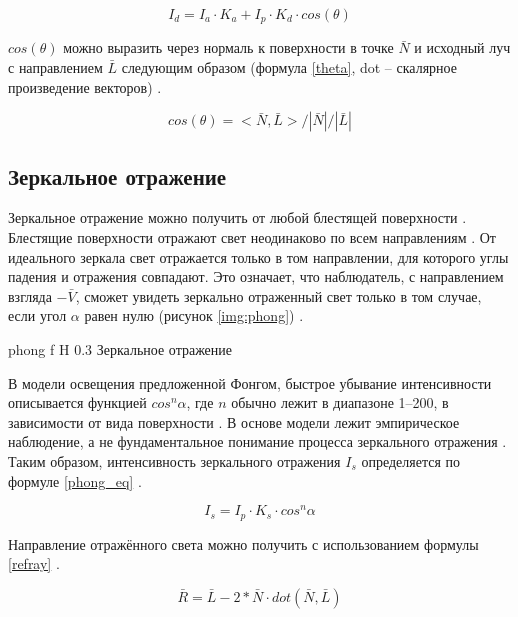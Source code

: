 \begin{equation}
	\label{lambert1}
	I_d = I_a \cdot K_a + I_p \cdot K_d \cdot cos(\theta)
\end{equation}

$cos{(\theta)}$ можно выразить через нормаль к поверхности в точке $\bar{N}$ и исходный луч  с направлением $\bar{L}$ следующим образом (формула \ref{theta}, dot -- скалярное произведение векторов) \cite{kgmmgtu}.

\begin{equation}
	\label{theta}
	cos(\theta) = <\bar{N}, \bar{L}> / |\bar{N}| / |\bar{L}|
\end{equation}

\subsection{Зеркальное отражение}

Зеркальное отражение можно получить от любой блестящей поверхности \cite{kgtomsk}. Блестящие поверхности отражают свет неодинаково по всем направлениям \cite{kgtomsk}. 
От идеального зеркала свет отражается только в том направлении, для которого углы падения и отражения совпадают. 
Это означает, что наблюдатель, с направлением взгляда $-\bar{V}$, сможет увидеть зеркально отраженный свет только в том случае, если угол $\alpha$ равен нулю (рисунок \ref{img:phong}) \cite{kgtomsk}.

{phong}
{f}
{H}
{0.3\textwidth}
{Зеркальное отражение}

В модели освещения предложенной Фонгом, быстрое убывание интенсивности описывается функцией $cos^{n}{\alpha}$, где $n$ обычно лежит в диапазоне 1–200, в зависимости от вида поверхности \cite{kgtomsk}. 
В основе модели лежит эмпирическое наблюдение, а не фундаментальное понимание процесса зеркального отражения \cite{kgtomsk}.
Таким образом, интенсивность зеркального отражения $I_s$ определяется по формуле \ref{phong_eq} \cite{kgtomsk}.

\begin{equation}
	\label{phong_eq}
	I_s = I_p \cdot K_s \cdot cos^{n}{\alpha}
\end{equation}

Направление отражённого света можно получить с использованием формулы \ref{refray} \cite{kgmmgtu}.

\begin{equation}
	\label{refray}
	\bar{R} = \bar{L} - 2 * \bar{N} \cdot dot(\bar{N}, \bar{L})
\end{equation}

